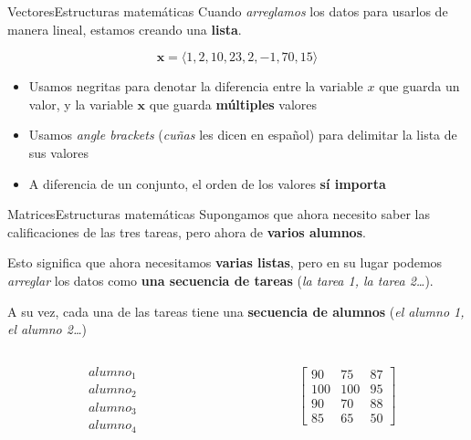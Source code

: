 \documentclass[spanish, c]{beamer}
\begin{document}
\begin{frame}{Vectores}{Estructuras matemáticas}
    Cuando \textit{arreglamos} los datos para usarlos de manera lineal, estamos creando una \textbf{lista}. \pause

    $$\mathbf{x} = \langle 1, 2, 10, 23, 2, -1, 70, 15\rangle$$

    \begin{itemize}[<+->]
        \item Usamos negritas para denotar la diferencia entre la variable $x$ que guarda un valor, y la variable $\mathbf{x}$ que guarda \textbf{múltiples} valores
        \item Usamos \textit{angle brackets} (\textit{cuñas} les dicen en español) para delimitar la lista de sus valores
        \item A diferencia de un conjunto, el orden de los valores \textbf{sí importa}
    \end{itemize}

\end{frame}

\begin{frame}{Matrices}{Estructuras matemáticas}
    Supongamos que ahora necesito saber las calificaciones de las tres tareas, pero ahora de \textbf{varios alumnos}.

    Esto significa que ahora necesitamos \textbf{varias listas}, pero en su lugar podemos \textit{arreglar} los datos como \textbf{una secuencia de tareas} (\textit{la tarea 1, la tarea 2\dots}). \pause
    
    A su vez, cada una de las tareas tiene una \textbf{secuencia de alumnos} (\textit{el alumno 1, el alumno 2\dots}) \pause

    \begin{columns}
        \begin{column}{0.5\textwidth}
            \begin{align*}
                & alumno_1 \\
                & alumno_2 \\
                & alumno_3 \\
                & alumno_4
            \end{align*}
        \end{column}

        \begin{column}{0.5\textwidth}
            \begin{align*}
                \begin{bmatrix}
                    90 & 75 & 87 \\
                    100 & 100 & 95 \\
                    90 & 70 & 88 \\
                    85 & 65 & 50
                \end{bmatrix}
            \end{align*}
        \end{column}
    \end{columns}
\end{frame}
\end{document}
